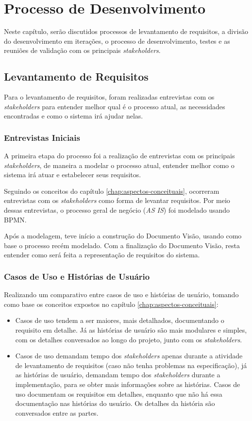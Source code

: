 \chapter{Processo de Desenvolvimento}\label{chap:processo-desenvolvimento}
Neste capítulo, serão discutidos processos de levantamento de requisitos, a divisão do desenvolvimento em iterações, o processo de desenvolvimento, testes e as reuniões de validação com os principais \textit{stakeholders}.

\section{Levantamento de Requisitos}
Para o levantamento de requisitos, foram realizadas entrevistas com os \textit{stakeholders} para entender melhor qual é o processo atual, as necessidades encontradas e como o sistema irá ajudar nelas.

\subsection{Entrevistas Iniciais}
A primeira etapa do processo foi a realização de entrevistas com os principais \textit{stakeholders}, de maneira a modelar o processo atual, entender melhor como o sistema irá atuar e estabelecer seus requisitos.

Seguindo os conceitos do capítulo \ref{chap:aspectos-conceituais}, ocorreram entrevistas com os \textit{stakeholders} como forma de levantar requisitos. Por meio dessas entrevistas, o processo geral de negócio (\textit{AS IS}) foi modelado usando BPMN.

Após a modelagem, teve início a construção do Documento Visão, usando como base o processo recém modelado. Com a finalização do Documento Visão, resta entender como será feita a representação de requisitos do sistema.

\subsection{Casos de Uso e Histórias de Usuário}
Realizando um comparativo entre casos de uso e histórias de usuário, tomando como base os conceitos expostos no capítulo \ref{chap:aspectos-conceituais}:

\begin{itemize}
    \item Casos de uso tendem a ser maiores, mais detalhados, documentando o requisito em detalhe. Já as histórias de usuário são mais modulares e simples, com os detalhes conversados ao longo do projeto, junto com os \textit{stakeholders}.
    \item Casos de uso demandam tempo dos \textit{stakeholders} apenas durante a atividade de levantamento de requisitos (caso não tenha problemas na especificação), já as histórias de usuário, demandam tempo dos \textit{stakeholders} durante a implementação, para se obter mais informações sobre as histórias. 
Casos de uso documentam os requisitos em detalhes, enquanto que não há essa documentação nas histórias do usuário. Os detalhes da história são conversados entre as partes.
\end{itemize}

